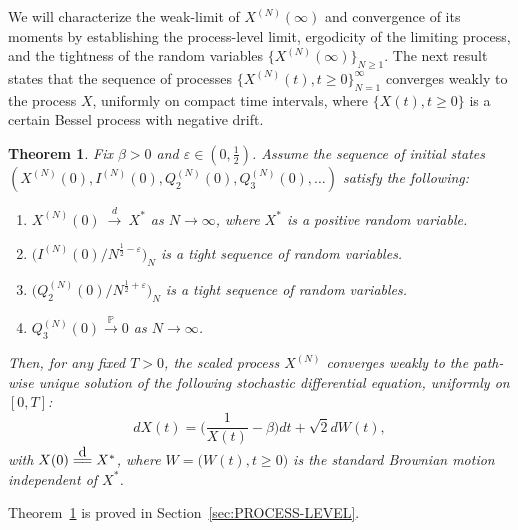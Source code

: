 \documentclass[11pt, reqno]{article}
\newtheorem{theorem}{Theorem}
\numberwithin{equation}{section}
\numberwithin{theorem}{section}
\newcommand\blue[1]{#1}
\newcommand{\PR}{\ensuremath{\mathbb{P}}}
\newcommand\disteq{\stackrel{\mathclap{\normalfont\mbox{d}}}{=\joinrel=}}
\newcommand\red[1]{\textcolor{black!20!red}{#1}}
\newcommand{\pto}{\ensuremath{\xrightarrow{\ \mathbb{P}\ }}}  %
\newcommand{\dto}{\ensuremath{\ \xrightarrow{d} \ }}  %
\begin{document}
We will characterize the weak-limit of $X^{(N)}(\infty)$ and convergence of its moments by establishing the process-level limit, ergodicity of the limiting process, and the tightness of the random variables $\{X^{(N)}(\infty)\}_{N \ge 1}$. The next result states that the sequence of processes $\big\{X^{(N)}(t),t\geq 0\big\}_{N=1}^{\infty}$  converges weakly to the process $X$, uniformly on compact time intervals, 
where $\big\{X(t),t\geq 0\big\}$ is a certain Bessel process with negative drift. 
\begin{theorem}\label{thm:PROCESS-LEVEL-NEW}
\blue{Fix $\beta>0$ and $\varepsilon \in (0, \frac{1}{2})$. 
Assume the sequence of initial states $(X^{(N)}(0), I^{(N)}(0), Q^{(N)}_2(0), Q^{(N)}_3(0), \ldots)$
satisfy the following:
\begin{enumerate}[\normalfont (i)]
    \item $X^{(N)}(0)\dto X^*$ as $N\to \infty$, where $X^*$ is a positive random variable.
    \item $\big(I^{(N)}(0)/N^{\frac{1}{2}-\varepsilon}\big)_N$ is a tight sequence of random variables.
    \item $\big(Q^{(N)}_2(0)/N^{\frac{1}{2}+\varepsilon}\big)_N$ is a tight sequence of random variables.
    \item  $Q_3^{(N)}(0) \pto 0$ as $N\to\infty$. 
\end{enumerate}
Then, for any fixed $T>0$, the scaled process $X^{(N)}$ converges weakly to the path-wise unique solution of the following stochastic differential equation, uniformly on $[0,T]$:
\begin{equation}\label{langevin}
    dX(t)=\Big(\frac{1}{X(t)}-\beta\Big)dt+\sqrt{2}dW(t),
\end{equation}
with $X(0)\disteq X^*$,
where $W=\big(W(t),t\geq 0\big)$ is the standard Brownian motion independent of $X^*$.}
\end{theorem}


Theorem~\ref{thm:PROCESS-LEVEL-NEW} is proved in Section~\ref{sec:PROCESS-LEVEL}.
\end{document}
